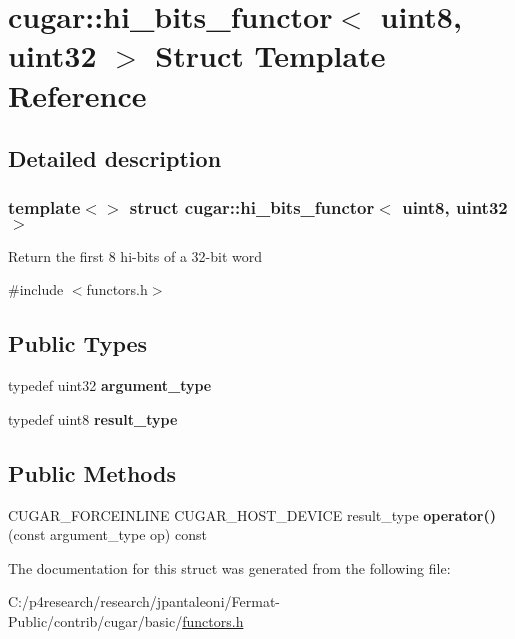\hypertarget{structcugar_1_1hi__bits__functor_3_01uint8_00_01uint32_01_4}{}\section{cugar\+:\+:hi\+\_\+bits\+\_\+functor$<$ uint8, uint32 $>$ Struct Template Reference}
\label{structcugar_1_1hi__bits__functor_3_01uint8_00_01uint32_01_4}


\subsection{Detailed description}
\subsubsection*{template$<$$>$\newline
struct cugar\+::hi\+\_\+bits\+\_\+functor$<$ uint8, uint32 $>$}

Return the first 8 hi-\/bits of a 32-\/bit word 

{\ttfamily \#include $<$functors.\+h$>$}

\subsection*{Public Types}
\begin{DoxyCompactItemize}
\item 
\mbox{\label{structcugar_1_1hi__bits__functor_3_01uint8_00_01uint32_01_4_ab1d4c68f9b3058bc9cbc9b75653e90ec}} 
typedef uint32 {\bfseries argument\+\_\+type}
\item 
\mbox{\label{structcugar_1_1hi__bits__functor_3_01uint8_00_01uint32_01_4_a5695a7618cc2aafd358f5e943fbaa352}} 
typedef uint8 {\bfseries result\+\_\+type}
\end{DoxyCompactItemize}
\subsection*{Public Methods}
\begin{DoxyCompactItemize}
\item 
\mbox{\label{structcugar_1_1hi__bits__functor_3_01uint8_00_01uint32_01_4_a1300f7e181d6726fec330499db39167c}} 
C\+U\+G\+A\+R\+\_\+\+F\+O\+R\+C\+E\+I\+N\+L\+I\+NE C\+U\+G\+A\+R\+\_\+\+H\+O\+S\+T\+\_\+\+D\+E\+V\+I\+CE result\+\_\+type {\bfseries operator()} (const argument\+\_\+type op) const
\end{DoxyCompactItemize}


The documentation for this struct was generated from the following file\+:\begin{DoxyCompactItemize}
\item 
C\+:/p4research/research/jpantaleoni/\+Fermat-\/\+Public/contrib/cugar/basic/\hyperlink{functors_8h}{functors.\+h}\end{DoxyCompactItemize}
